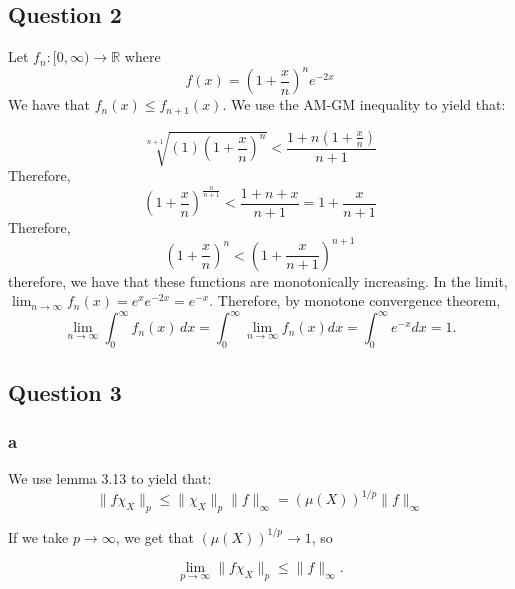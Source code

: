 \documentclass{article}
\theoremstyle{definition}
\numberwithin{theorem}{section}
\numberwithin{equation}{section}
\begin{document}
\subsection*{Question 2}

Let $f_n : [0, \infty) \rightarrow \mathbb{R}$ where
\begin{equation}
	f(x) = \left( 1 + \frac{x}{n}\right)^n e^{-2x}
\end{equation}
We have that $f_n(x) \leq f_{n+1}(x)$. We use the AM-GM inequality to yield that:

\begin{equation}
	\sqrt[n + 1]{(1) \left( 1 + \frac{x}{n}\right)^n} < \frac{1 + n \left( 1 + \frac{x}{n}\right)}{n + 1}
\end{equation}
Therefore,
\begin{equation}
	\left( 1 + \frac{x}{n}\right)^{\frac{n}{n + 1}} < \frac{1 + n + x}{n + 1} = 1 + \frac{x}{n + 1}
\end{equation}
Therefore,
\begin{equation}
	\left( 1 + \frac{x}{n}\right)^n < \left( 1 + \frac{x}{n+1}\right)^{n + 1}
\end{equation}
therefore, we have that these functions are monotonically increasing. In the limit,
$\lim_{n \rightarrow \infty} f_n(x) = e^{x} e^{-2x} = e^{-x}$. 
Therefore, by monotone convergence theorem,
\begin{equation}
	\lim_{n \rightarrow \infty} \int_{0}^\infty f_n(x) \, dx = \int_{0}^\infty \lim_{n \rightarrow \infty} f_n(x) dx = \int_{0}^\infty e^{-x} dx = 1. 
\end{equation}
\subsection*{Question 3}
\subsubsection*{a}
We use lemma 3.13 to yield that:
\begin{equation}
	\| f \chi_X \|_p \leq \| \chi_X \|_p \|f \|_\infty = (\mu(X))^{1/p} \|f \|_{\infty}
\end{equation}

If we take $p \rightarrow \infty$, we get that $(\mu(X))^{1/p} \rightarrow 1$, so 

\begin{equation}
	\lim_{p \rightarrow \infty} \| f \chi_X \|_p \leq \|f \|_{\infty}.
\end{equation}
\end{document}
